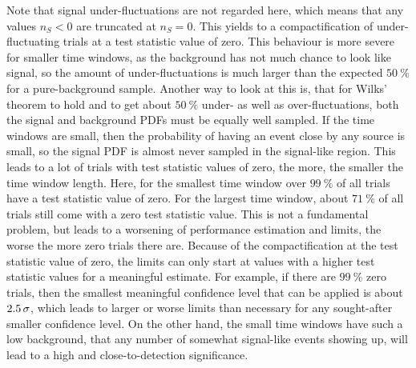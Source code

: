 Note that signal under-fluctuations are not regarded here, which means that any values $n_S < 0$ are truncated at $n_S = 0$.
This yields to a compactification of under-fluctuating trials at a test statistic value of zero.
This behaviour is more severe for smaller time windows, as the background has not much chance to look like signal, so the amount of under-fluctuations is much larger than the expected $\SI{50}{\percent}$ for a pure-background sample.
Another way to look at this is, that for Wilks' theorem to hold and to get about $\SI{50}{\percent}$ under- as well as over-fluctuations, both the signal and background PDFs must be equally well sampled.
If the time windows are small, then the probability of having an event close by any source is small, so the signal PDF is almost never sampled in the signal-like region.
This leads to a lot of trials with test statistic values of zero, the more, the smaller the time window length.
Here, for the smallest time window over $\SI{99}{\percent}$ of all trials have a test statistic value of zero.
For the largest time window, about $\SI{71}{\percent}$ of all trials still come with a zero test statistic value.
This is not a fundamental problem, but leads to a worsening of performance estimation and limits, the worse the more zero trials there are.
Because of the compactification at the test statistic value of zero, the limits can only start at values with a higher test statistic values for a meaningful estimate.
For example, if there are $\SI{99}{\percent}$ zero trials, then the smallest meaningful confidence level that can be applied is about $\num{2.5}\,\sigma$, which leads to larger or worse limits than necessary for any sought-after smaller confidence level.
On the other hand, the small time windows have such a low background, that any number of somewhat signal-like events showing up, will lead to a high and close-to-detection significance.

